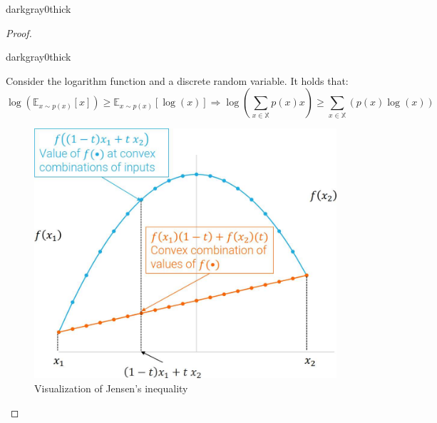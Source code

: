 \begin{description}
\begin{description}
\begin{marginbar}{darkgray}{0}{thick}
\begin{proof}
\begin{marginbar}{darkgray}{0}{thick}
\begin{lemma}
                        \indenttbox
                        \begin{example}
                            Consider the logarithm function and a discrete random variable. It holds that:
                            \[ \log\left( \mathbb{E}_{x \sim p(x)}[x] \right) \geq \mathbb{E}_{x \sim p(x)}[\log(x)] \Rightarrow \log\left( \sum_{x \in \mathbb{X}} p(x)x \right) \geq \sum_{x \in \mathbb{X}} (p(x)\log(x)) \]
                        \end{example}

                        \begin{figure}[H]
                            \centering
                            \includegraphics[width=0.45\linewidth]{./img/jensen_inequality.jpg}
                            \caption{Visualization of Jensen's inequality}
                        \end{figure}
                    \end{lemma}
                    \end{marginbar}


\end{proof}
\end{marginbar}
\end{description}
\end{description}
